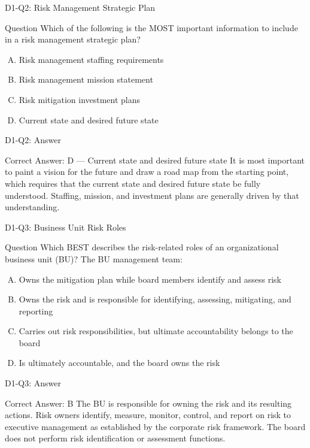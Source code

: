 \documentclass{beamer}
\begin{document}
	\begin{frame}{D1-Q2: Risk Management Strategic Plan}
		\begin{block}{Question}
			Which of the following is the MOST important information to include in a risk management strategic plan?
		\end{block}
		\begin{enumerate}[(A)]
			\item Risk management staffing requirements
			\item Risk management mission statement
			\item Risk mitigation investment plans
			\item Current state and desired future state
		\end{enumerate}
	\end{frame}
	\begin{frame}{D1-Q2: Answer}
		\begin{block}{Correct Answer: D --- Current state and desired future state}
			It is most important to paint a vision for the future and draw a road map from the starting point, which requires that the current state and desired future state be fully understood. Staffing, mission, and investment plans are generally driven by that understanding.
		\end{block}
	\end{frame}
	
	\begin{frame}{D1-Q3: Business Unit Risk Roles}
		\begin{block}{Question}
			Which BEST describes the risk-related roles of an organizational business unit (BU)? The BU management team:
		\end{block}
		\begin{enumerate}[(A)]
			\item Owns the mitigation plan while board members identify and assess risk
			\item Owns the risk and is responsible for identifying, assessing, mitigating, and reporting
			\item Carries out risk responsibilities, but ultimate accountability belongs to the board
			\item Is ultimately accountable, and the board owns the risk
		\end{enumerate}
	\end{frame}
	\begin{frame}{D1-Q3: Answer}
		\begin{block}{Correct Answer: B}
			The BU is responsible for owning the risk and its resulting actions. Risk owners identify, measure, monitor, control, and report on risk to executive management as established by the corporate risk framework. The board does not perform risk identification or assessment functions.
		\end{block}
	\end{frame}
	
\end{document}
